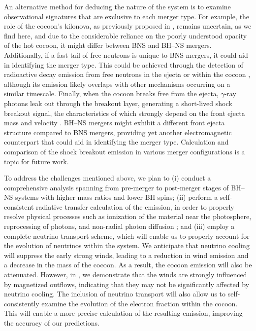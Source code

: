 \documentclass[twocolumn,dvipsnames]{aastex62}
\begin{document}
An alternative method for deducing the nature of the system is to examine observational signatures that are exclusive to each merger type. For example, the role of the cocoon's kilonova, as previously proposed in \citet{Nakar2017,Gottlieb2018a,Gottlieb2020c,Hamidani2022}, remains uncertain, as we find here, and due to the considerable reliance on the poorly understood opacity of the hot cocoon, it might differ between BNS and BH--NS mergers. Additionally, if a fast tail of free neutrons is unique to BNS mergers, it could aid in identifying the merger type. This could be achieved through the detection of radioactive decay emission from free neutrons in the ejecta \citep{Metzger2015} or within the cocoon \citep{Gottlieb2020c}, although its emission likely overlaps with other mechanisms occurring on a similar timescale. Finally, when the cocoon breaks free from the ejecta, $ \gamma $-ray photons leak out through the breakout layer, generating a short-lived shock breakout signal, the characteristics of which strongly depend on the front ejecta mass and velocity \citep{Gottlieb2018b}. BH--NS mergers might exhibit a different front ejecta structure compared to BNS mergers, providing yet another electromagnetic counterpart that could aid in identifying the merger type. Calculation and comparison of the shock breakout emission in various merger configurations is a topic for future work.

To address the challenges mentioned above, we plan to
(i) conduct a comprehensive analysis spanning from pre-merger to post-merger stages of BH--NS systems with higher mass ratios and lower BH spins;
(ii) perform a self-consistent radiative transfer calculation of the emission, in order to properly resolve physical processes such as ionization of the material near the photosphere, reprocessing of photons, and non-radial photon diffusion \citep{Darbha2020,Darbha2021}; and
(iii) employ a complete neutrino transport scheme, which will enable us to properly account for the evolution of neutrinos within the system. We anticipate that neutrino cooling will suppress the early strong winds, leading to a reduction in wind emission and a decrease in the mass of the cocoon. As a result, the cocoon emission will also be attenuated. However, in \citet{Gottlieb2023}, we demonstrate that the winds are strongly influenced by magnetized outflows, indicating that they may not be significantly affected by neutrino cooling. The inclusion of neutrino transport will also allow us to self-consistently examine the evolution of the electron fraction within the cocoon. This will enable a more precise calculation of the resulting emission, improving the accuracy of our predictions.
                
\end{document}
